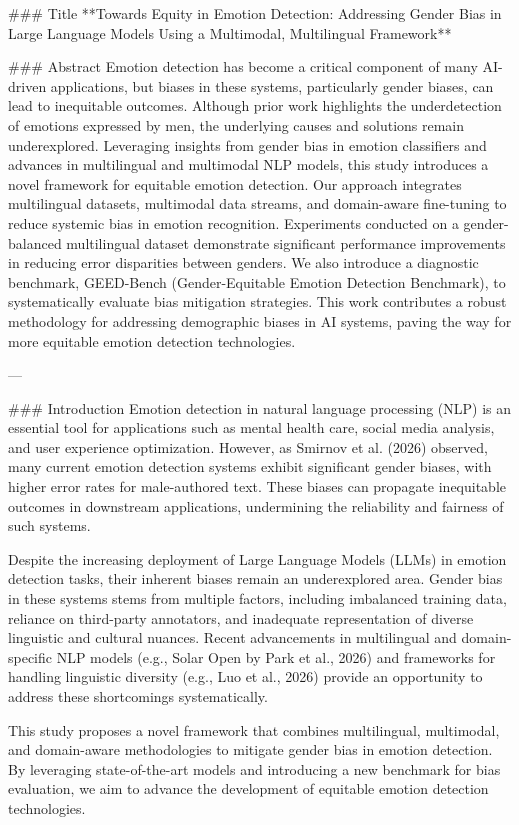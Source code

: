 ### Title
**Towards Equity in Emotion Detection: Addressing Gender Bias in Large Language Models Using a Multimodal, Multilingual Framework**

### Abstract
Emotion detection has become a critical component of many AI-driven applications, but biases in these systems, particularly gender biases, can lead to inequitable outcomes. Although prior work highlights the underdetection of emotions expressed by men, the underlying causes and solutions remain underexplored. Leveraging insights from gender bias in emotion classifiers and advances in multilingual and multimodal NLP models, this study introduces a novel framework for equitable emotion detection. Our approach integrates multilingual datasets, multimodal data streams, and domain-aware fine-tuning to reduce systemic bias in emotion recognition. Experiments conducted on a gender-balanced multilingual dataset demonstrate significant performance improvements in reducing error disparities between genders. We also introduce a diagnostic benchmark, GEED-Bench (Gender-Equitable Emotion Detection Benchmark), to systematically evaluate bias mitigation strategies. This work contributes a robust methodology for addressing demographic biases in AI systems, paving the way for more equitable emotion detection technologies.

---

### Introduction
Emotion detection in natural language processing (NLP) is an essential tool for applications such as mental health care, social media analysis, and user experience optimization. However, as Smirnov et al. (2026) observed, many current emotion detection systems exhibit significant gender biases, with higher error rates for male-authored text. These biases can propagate inequitable outcomes in downstream applications, undermining the reliability and fairness of such systems.

Despite the increasing deployment of Large Language Models (LLMs) in emotion detection tasks, their inherent biases remain an underexplored area. Gender bias in these systems stems from multiple factors, including imbalanced training data, reliance on third-party annotators, and inadequate representation of diverse linguistic and cultural nuances. Recent advancements in multilingual and domain-specific NLP models (e.g., Solar Open by Park et al., 2026) and frameworks for handling linguistic diversity (e.g., Luo et al., 2026) provide an opportunity to address these shortcomings systematically.

This study proposes a novel framework that combines multilingual, multimodal, and domain-aware methodologies to mitigate gender bias in emotion detection. By leveraging state-of-the-art models and introducing a new benchmark for bias evaluation, we aim to advance the development of equitable emotion detection technologies.

